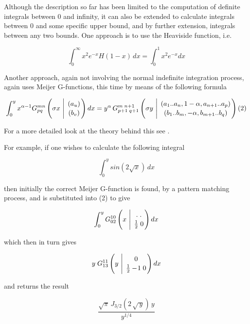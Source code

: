 Although the description so far has been limited to the computation of
definite integrals between 0 and infinity, it can also be extended to
calculate integrals between 0 and some specific upper bound, and
by further extension, integrals between any two bounds.  One approach is
to use the Heaviside function, i.e.

\begin{displaymath}
\int_{0}^{\infty} x^{2} e^{-x} H(1-x)\,dx = \int_{0}^{1} x^{2} e^{-x}dx
\end{displaymath}

Another approach, again not involving the normal indefinite integration
process, again uses Meijer G-functions, this time by means of the
following formula

\begin{displaymath}
\int_{0}^{y} x^{\alpha-1} G^{m n}_{p q}
\left( \sigma x \  \Bigg\vert \  {( a_u) \atop (b_v)} \right) dx=%
y^{\alpha}\,G^{m \; n+1}_{p+1 \; q+1} \left( \sigma y \  \Bigg\vert \
{( a_1..a_n,1-\alpha,a_{n+1}..a_p)
\atop (b_1..b_m,-\alpha,b_{m+1}..b_q)} \right) (2)
\end{displaymath}

For a more detailed look at the theory behind this see
\cite{Adamchik:90}.

For example, if one wishes to calculate the following integral

\begin{displaymath}
\int_{0}^{y} sin(2 \sqrt{x}) \, dx
\end{displaymath}

then initially the correct Meijer G-function is found, by a pattern
matching process, and is substituted
into (2) to give

\begin{displaymath}
\int_{0}^{y} G^{1 0}_{0 2}\left(x
\ \Bigg\vert \ {. \; .  \atop \frac{1}{2} \; 0} \right) dx
\end{displaymath}

which then in turn gives

\begin{displaymath}
y \; G^{1 1}_{1 3}\left(y \ \Bigg\vert \ {0 \atop
\frac{1}{2} -\!1 \; 0} \right) dx
\end{displaymath}

and returns the result

\begin{displaymath}
\frac{\sqrt{\pi} \, J_{3/2}(2 \, \sqrt{\,y}) \, y}{y^{1/4}}
\end{displaymath}

